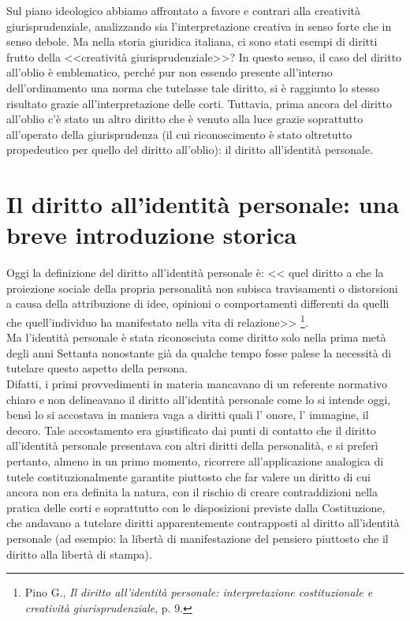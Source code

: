 Sul piano ideologico abbiamo affrontato a favore e contrari alla creatività giurisprudenziale, analizzando sia l'interpretazione creativa in senso forte che in senso debole. 
Ma nella storia giuridica italiana, ci sono stati esempi di diritti frutto della <<creatività giurisprudenziale>>?
In questo senso, il caso del diritto all'oblio è emblematico, perché pur non essendo presente all'interno dell'ordinamento una norma che tutelasse tale diritto, si è raggiunto lo stesso risultato grazie all'interpretazione delle corti.
Tuttavia, prima ancora del diritto all'oblio c'è stato un altro diritto che è venuto alla luce grazie soprattutto all'operato della giurisprudenza (il cui riconoscimento è stato oltretutto propedeutico per quello del diritto all'oblio): il diritto all'identità personale.

\section{Il diritto all'identità personale: una breve introduzione storica}
Oggi la definizione del diritto all'identità personale è: << quel diritto a che la proiezione sociale della propria personalità non subisca travisamenti
o distorsioni a causa della attribuzione di idee, opinioni o comportamenti differenti da quelli che quell’individuo ha manifestato nella vita di relazione>>
\footnote{Pino G.,\textit{ Il diritto all'identità personale: interpretazione costituzionale e creatività giurisprudenziale}, p. 9.}.
\\Ma l'identità personale è stata riconosciuta come diritto solo nella prima metà degli anni Settanta nonostante già da qualche tempo fosse palese la necessità di tutelare questo aspetto della persona.
\\Difatti, i primi provvedimenti in materia mancavano di un referente normativo chiaro e non delineavano il diritto all’identità personale come lo si intende oggi, bensì lo si accostava in maniera vaga a diritti quali l' onore, l' immagine, il decoro.
Tale accostamento era giustificato dai punti di contatto che il diritto all'identità personale presentava con altri diritti della personalità, e si preferì pertanto, almeno in un primo momento, ricorrere all'applicazione analogica di tutele costituzionalmente garantite piuttosto che far valere un diritto di cui ancora non era definita la natura, con il rischio di creare contraddizioni nella pratica delle corti e soprattutto con le disposizioni previste dalla Costituzione, che andavano a tutelare diritti apparentemente contrapposti al diritto all'identità personale (ad esempio: la libertà di manifestazione del pensiero piuttosto che il diritto alla libertà di stampa).
